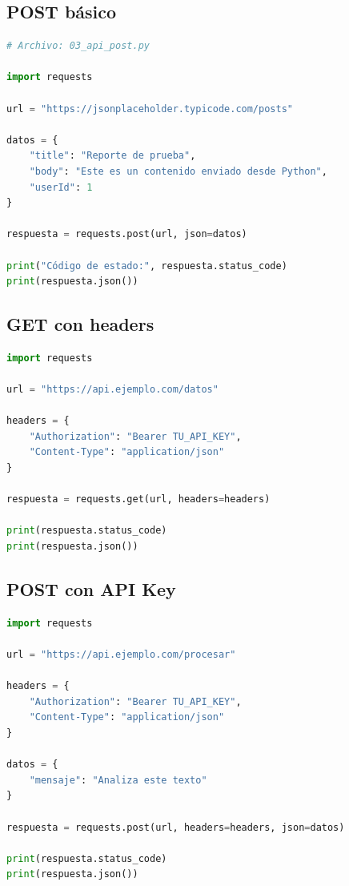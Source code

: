 \documentclass[12pt]{article}
\begin{document}
\subsection{POST básico}

\begin{lstlisting}[language=Python]
# Archivo: 03_api_post.py

import requests

url = "https://jsonplaceholder.typicode.com/posts"

datos = {
    "title": "Reporte de prueba",
    "body": "Este es un contenido enviado desde Python",
    "userId": 1
}

respuesta = requests.post(url, json=datos)

print("Código de estado:", respuesta.status_code)
print(respuesta.json())
\end{lstlisting}

\subsection{GET con headers}

\begin{lstlisting}[language=Python]
import requests

url = "https://api.ejemplo.com/datos"

headers = {
    "Authorization": "Bearer TU_API_KEY",
    "Content-Type": "application/json"
}

respuesta = requests.get(url, headers=headers)

print(respuesta.status_code)
print(respuesta.json())
\end{lstlisting}

\subsection{POST con API Key}

\begin{lstlisting}[language=Python]
import requests

url = "https://api.ejemplo.com/procesar"

headers = {
    "Authorization": "Bearer TU_API_KEY",
    "Content-Type": "application/json"
}

datos = {
    "mensaje": "Analiza este texto"
}

respuesta = requests.post(url, headers=headers, json=datos)

print(respuesta.status_code)
print(respuesta.json())
\end{lstlisting}
\end{document}
